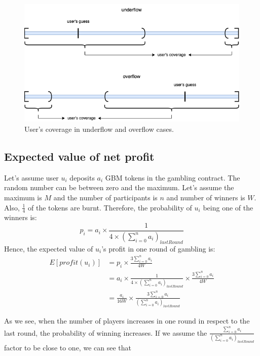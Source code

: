 \documentclass{article}
\begin{document}
\begin{figure}
    \centering
    \includegraphics[width=\textwidth]{coverage2.png}
    \caption{User's coverage in underflow and overflow cases.}
    \label{fig:overflow}
\end{figure}

\subsection{Expected value of net profit}

Let's assume user $u_i$ deposits $a_i$ GBM tokens in the gambling contract. The random number can be between zero and the maximum. Let's assume the maximum is $M$ and the number of participants is $n$ and number of winners is $W$. Also, $\frac{1}{4}$ of the tokens are burnt.
Therefore, the probability of $u_i$ being one of the winners is:
\begin{equation*}
    p_i = a_i \times \frac{1}{4\times (\sum_{i = 0}^{n} a_i)_{lastRound}}
\end{equation*}
Hence, the expected value of $u_i$'s profit in one round of gambling is:
\begin{align*}
    E[profit(u_i)] &= p_i \times \frac{3\sum_{i=0}^{n}a_i}{4W} \\
    &=
    a_i \times \frac{1}{4\times (\sum_{i = 0}^{n} a_i)_{lastRound}} \times 
    \frac{3\sum_{i=0}^{n}a_i}{4W} \\
    &= 
    \frac{a_i}{16 W} \times \frac{3\sum_{i=0}^{n} a_i}{(\sum_{i=0}^{n} a_i)_{lastRound}}
\end{align*}

As we see, when the number of players increases in one round in respect to the last round, the probability of winning increases. If we assume the 
$\frac{\sum_{i=0}^{n} a_i}{(\sum_{i=0}^{n} a_i)_{lastRound}}$ factor to be close to one, we can see that 
\end{document}
